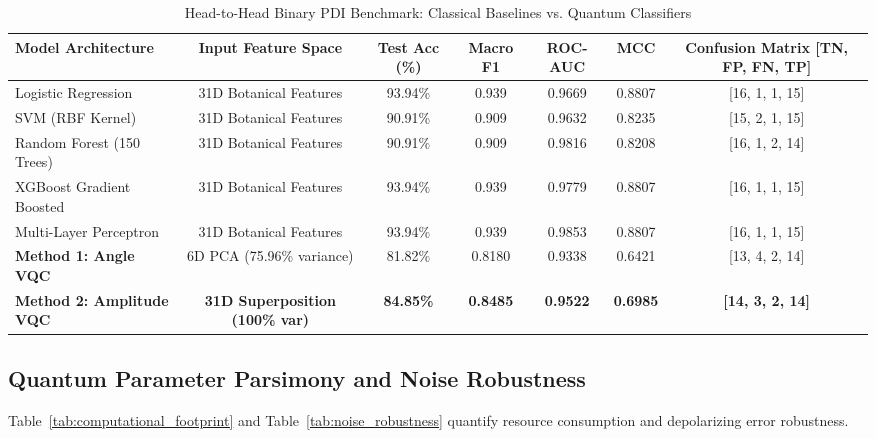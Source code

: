 \documentclass{ieeeaccess}
\begin{document}
\begin{table}[t]
\caption{Head-to-Head Binary PDI Benchmark: Classical Baselines vs. Quantum Classifiers}
\label{tab:head_to_head_binary}
\centering
\begin{tabular*}{\textwidth}{@{\extracolsep{\fill}}lcccccc@{}}
\toprule
\textbf{Model Architecture} & \textbf{Input Feature Space} & \textbf{Test Acc (\%)} & \textbf{Macro F1} & \textbf{ROC-AUC} & \textbf{MCC} & \textbf{Confusion Matrix [TN, FP, FN, TP]} \\
\midrule
Logistic Regression         & 31D Botanical Features       & 93.94\%                & 0.939             & 0.9669           & 0.8807       & [16, 1, 1, 15] \\
SVM (RBF Kernel)            & 31D Botanical Features       & 90.91\%                & 0.909             & 0.9632           & 0.8235       & [15, 2, 1, 15] \\
Random Forest (150 Trees)   & 31D Botanical Features       & 90.91\%                & 0.909             & 0.9816           & 0.8208       & [16, 1, 2, 14] \\
XGBoost Gradient Boosted    & 31D Botanical Features       & 93.94\%                & 0.939             & 0.9779           & 0.8807       & [16, 1, 1, 15] \\
Multi-Layer Perceptron      & 31D Botanical Features       & 93.94\%                & 0.939             & 0.9853           & 0.8807       & [16, 1, 1, 15] \\
\midrule
\textbf{Method 1: Angle VQC}    & 6D PCA (75.96\% variance)    & 81.82\%                & 0.8180            & 0.9338           & 0.6421       & [13, 4, 2, 14] \\
\textbf{Method 2: Amplitude VQC}& \textbf{31D Superposition (100\% var)} & \textbf{84.85\%} & \textbf{0.8485} & \textbf{0.9522}  & \textbf{0.6985}& \textbf{[14, 3, 2, 14]} \\
\bottomrule
\end{tabular*}
\end{table}

\subsection{Quantum Parameter Parsimony and Noise Robustness}
Table~\ref{tab:computational_footprint} and Table~\ref{tab:noise_robustness} quantify resource consumption and depolarizing error robustness.
\end{document}
